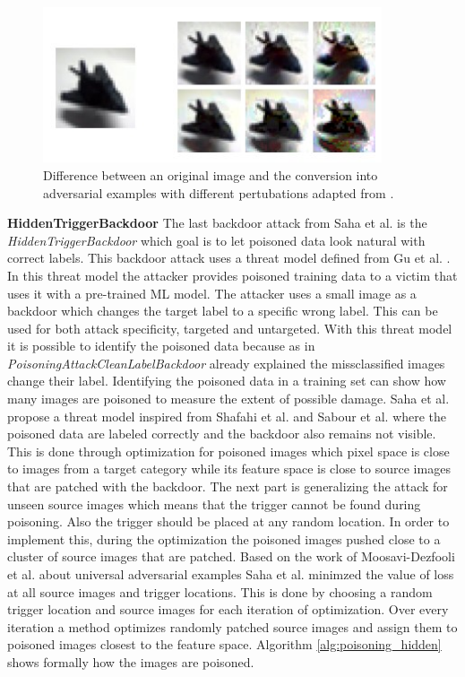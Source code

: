 \begin{figure}[ht!]
  \centering
  \includegraphics[width=10cm]{pictures/poisoned_clean_label.jpg}
  \caption{Difference between an original image and the conversion into adversarial examples with different pertubations adapted from \cite{turner2018clean}.}
  \label{fig:poisoned_clean_label}
\end{figure}

\textbf{HiddenTriggerBackdoor} The last backdoor attack from Saha et al. \cite{DBLP:journals/corr/abs-1910-00033} is the \textit{HiddenTriggerBackdoor} which goal is to let poisoned data look natural with correct labels. This backdoor attack uses a threat model defined from Gu et al. \cite{DBLP:journals/corr/abs-1708-06733}. In this threat model the attacker provides poisoned training data to a victim that uses it with a pre-trained ML model. The attacker uses a small image as a backdoor which changes the target label to a specific wrong label. This can be used for both attack specificity, targeted and untargeted. With this threat model it is possible to identify the poisoned data because as in \textit{PoisoningAttackCleanLabelBackdoor} already explained the missclassified images change their label. Identifying the poisoned data in a training set can show how many images are poisoned to measure the extent of possible damage. Saha et al. propose a threat model inspired from Shafahi et al. \cite{DBLP:journals/corr/abs-1804-00792} and Sabour et al. \cite{DBLP:journals/corr/SabourCFF15} where the poisoned data are labeled correctly and the backdoor also remains not visible. This is done through optimization for poisoned images which pixel space is close to images from a target category while its feature space is close to source images that are patched with the backdoor. The next part is generalizing the attack for unseen source images which means that the trigger cannot be found during poisoning. Also the trigger should be placed at any random location. In order to implement this, during the optimization the poisoned images pushed close to a cluster of source images that are patched. Based on the work of Moosavi-Dezfooli et al. \cite{DBLP:conf/cvpr/Moosavi-Dezfooli17} about universal adversarial examples Saha et al. minimzed the value of loss at all source images and trigger locations. This is done by choosing a random trigger location and source images for each
iteration of optimization. Over every iteration a method optimizes randomly patched source images and assign them to poisoned images closest to the feature space. Algorithm \ref{alg:poisoning_hidden} shows formally how the images are poisoned.

